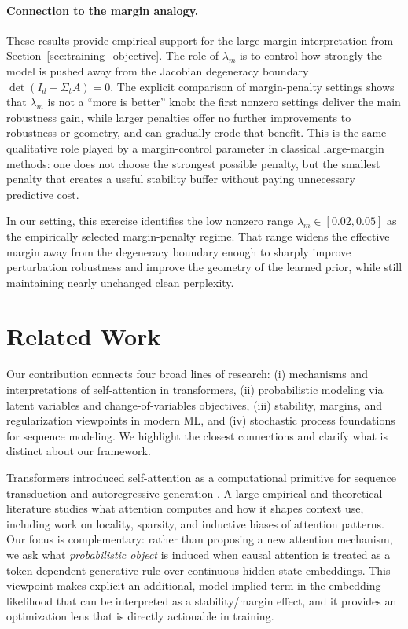 \documentclass[11pt]{article}
\begin{document}
\paragraph{Connection to the margin analogy.}
These results provide empirical support for the large-margin interpretation from
Section~\ref{sec:training_objective}. The role of $\lambda_m$ is to control how strongly the model
is pushed away from the Jacobian degeneracy boundary $\det(I_d-\Sigma_t A)=0$.
The explicit comparison of margin-penalty settings shows that $\lambda_m$ is
not a ``more is better'' knob: the first nonzero settings deliver the main
robustness gain, while larger penalties offer no further improvements to robustness or geometry,
and can gradually erode that benefit. This is the same qualitative role played
by a margin-control parameter in classical large-margin methods: one does not
choose the strongest possible penalty, but the smallest penalty that creates a
useful stability buffer without paying unnecessary predictive cost.

In our setting, this exercise identifies the low nonzero range $\lambda_m \in [0.02, 0.05]$
as the empirically selected margin-penalty regime. That range widens the
effective margin away from the degeneracy boundary enough to sharply improve
perturbation robustness and improve the geometry of the learned prior, while
still maintaining nearly unchanged clean perplexity.

\section{Related Work}
\label{sec:related_work}

Our contribution connects four broad lines of research: (i) mechanisms and interpretations of
self-attention in transformers, (ii) probabilistic modeling via latent variables and
change-of-variables objectives, (iii) stability, margins, and regularization viewpoints in
modern ML, and (iv) stochastic process foundations for sequence modeling. We highlight the closest connections and clarify what is distinct about our framework.

Transformers introduced self-attention as a computational primitive for sequence transduction
and autoregressive generation \citep{VaswaniShPaUsJoGoKaPo17}.
A large empirical and theoretical literature studies what attention computes and how it shapes
context use, including work on locality, sparsity, and inductive biases of attention patterns. 
Our focus is complementary: rather than proposing a new attention mechanism, we ask what
\emph{probabilistic object} is induced when causal attention is treated as a token-dependent
generative rule over continuous hidden-state embeddings. This viewpoint makes explicit an
additional, model-implied term in the embedding likelihood that can be interpreted as a
stability/margin effect, and it provides an optimization lens that is directly actionable in
training.
\end{document}
